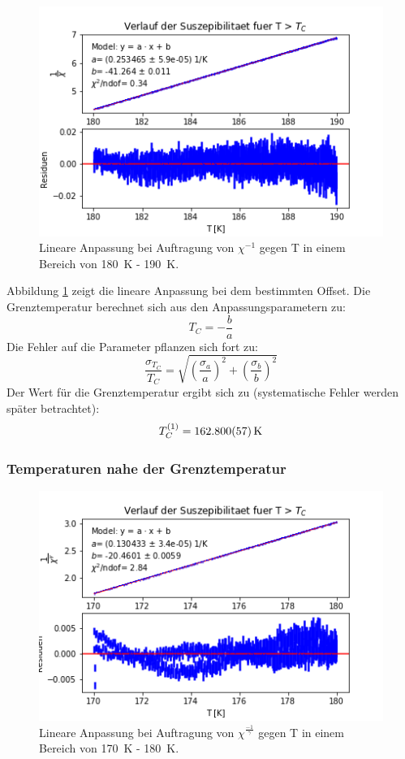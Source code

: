 \documentclass[12pt,a4paper]{article}
\begin{document}
\begin{figure}
\centering
\includegraphics[scale=1]{Bilder/Haupt_Probe/CurieWeiss.png}
\caption[test]{Lineare Anpassung bei Auftragung von $\chi ^{-1}$ gegen T in einem Bereich von \SI{180}{K} - \SI{190}{K}.}
\label{fig:CurieWeiss}
\end{figure}

Abbildung \ref{fig:CurieWeiss} zeigt die lineare Anpassung bei dem bestimmten Offset. Die Grenztemperatur berechnet sich aus den Anpassungsparametern zu:
\begin{equation}
T_C = -\dfrac{b}{a}
\label{eq:ProbeGrenztemperatur}
\end{equation}
Die Fehler auf die Parameter pflanzen sich fort zu:
\begin{equation}
\dfrac{\sigma _{T_C}}{T_C} = \sqrt{\left( \dfrac{\sigma _a}{a} \right)^2 + \left( \dfrac{\sigma _b}{b} \right)^2}
\label{eq:ProbeGrenztemperaturFehler}
\end{equation}
Der Wert für die Grenztemperatur ergibt sich zu (systematische Fehler werden später betrachtet):
\begin{equation*}
T_C^{(1)} = \SI{162,800 \pm 0,057}{K}
\end{equation*}

\subsubsection{Temperaturen nahe der Grenztemperatur}

\begin{figure}
\centering
\includegraphics[scale=1]{Bilder/Haupt_Probe/CurieWeiss_gamma.png}
\caption[test]{Lineare Anpassung bei Auftragung von $\chi ^{\frac{-1}{\gamma}}$ gegen T in einem Bereich von \SI{170}{K} - \SI{180}{K}.}
\label{fig:CurieWeiss_gamma}
\end{figure}
\end{document}
